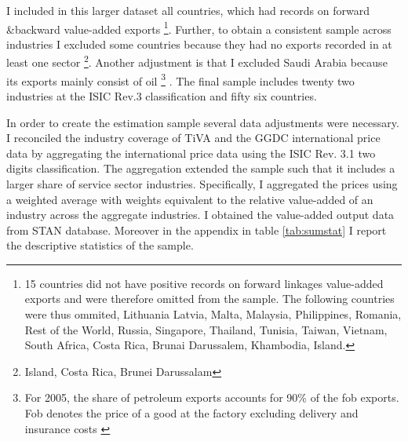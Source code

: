 I included in this larger dataset all countries, which had records on forward \&backward value-added exports \footnote{15 countries did not have positive records on forward linkages value-added exports and were therefore omitted from the sample.
The following countries were thus ommited, Lithuania Latvia, Malta, Malaysia, Philippines, Romania, Rest of the World, Russia, Singapore, Thailand, Tunisia, Taiwan, Vietnam, South Africa, Costa Rica, Brunai Darussalem, Khambodia, Island.}.
Further, to obtain a consistent sample across industries I excluded some countries because they had no exports recorded in at least one sector \footnote{ Island, Costa Rica, Brunei Darussalam}. %
Another adjustment is that I excluded Saudi Arabia because its exports mainly consist of oil \footnote{ For 2005, the share of petroleum exports accounts for  90\% of the fob exports. Fob denotes the price of a good at the factory excluding delivery and insurance costs \parencite[p.78]{combes}} \parencite{opec}.
The final sample includes twenty two industries at the ISIC Rev.3 classification and fifty six countries.
\par
In order to create the estimation sample several data adjustments were necessary.
I reconciled the industry coverage of TiVA and the GGDC international price data by aggregating the international price data using the ISIC Rev. 3.1 two digits classification.
The aggregation extended the sample such that it includes a larger share of service sector industries.
Specifically, I aggregated  the prices using a weighted average with weights equivalent to the relative value-added of an industry across the aggregate industries. I obtained the value-added output data from  \textcite{OECDSTAN} STAN database.
Moreover in the appendix in table \ref{tab:sumstat} I report the descriptive statistics of the sample.
\endinput
